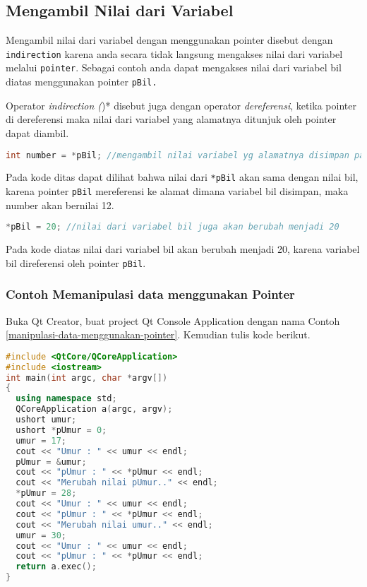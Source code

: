 \subsection{Mengambil Nilai dari
Variabel}\label{mengambil-nilai-dari-variabel}

Mengambil nilai dari variabel dengan menggunakan pointer disebut dengan
\texttt{indirection} karena anda secara tidak langsung mengakses nilai
dari variabel melalui \texttt{pointer}. Sebagai contoh anda dapat
mengakses nilai dari variabel bil diatas menggunakan pointer
\texttt{pBil.}

Operator \emph{indirection (})* disebut juga dengan operator
\emph{dereferensi}, ketika pointer di dereferensi maka nilai dari
variabel yang alamatnya ditunjuk oleh pointer dapat diambil.

\begin{lstlisting}[language=c++, numbers=none]
int number = *pBil; //mengambil nilai variabel yg alamatnya disimpan padapointer pBil
\end{lstlisting}

Pada kode ditas dapat dilihat bahwa nilai dari \texttt{*pBil} akan sama
dengan nilai bil, karena pointer \texttt{pBil} mereferensi ke alamat
dimana variabel bil disimpan, maka number akan bernilai 12.

\begin{lstlisting}[language=c++, numbers=none]
*pBil = 20; //nilai dari variabel bil juga akan berubah menjadi 20
\end{lstlisting}

Pada kode diatas nilai dari variabel bil akan berubah menjadi 20, karena
variabel bil direferensi oleh pointer \texttt{pBil}.

\subsubsection*{Contoh  Memanipulasi data menggunakan Pointer}

Buka Qt Creator, buat project Qt Console Application dengan nama Contoh
\ref{manipulasi-data-menggunakan-pointer}. Kemudian tulis kode berikut.

\begin{lstlisting}[language=c++, caption=Memanipulasi data menggunakan Pointer, label=manipulasi-data-menggunakan-pointer]
#include <QtCore/QCoreApplication>
#include <iostream>
int main(int argc, char *argv[])
{
  using namespace std;
  QCoreApplication a(argc, argv);
  ushort umur;
  ushort *pUmur = 0;
  umur = 17;
  cout << "Umur : " << umur << endl;
  pUmur = &umur;
  cout << "pUmur : " << *pUmur << endl;
  cout << "Merubah nilai pUmur.." << endl;
  *pUmur = 28;
  cout << "Umur : " << umur << endl;
  cout << "pUmur : " << *pUmur << endl;
  cout << "Merubah nilai umur.." << endl;
  umur = 30;
  cout << "Umur : " << umur << endl;
  cout << "pUmur : " << *pUmur << endl;
  return a.exec();
}
\end{lstlisting}

